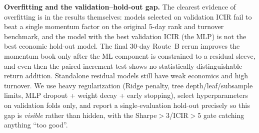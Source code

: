 \documentclass[9pt]{extarticle}
\begin{document}
\textbf{Overfitting and the validation--hold-out gap.} The clearest evidence of
overfitting is in the results themselves: models selected on validation ICIR
fail to beat a single momentum factor on the original 5-day rank and turnover
benchmark, and the model with the best validation ICIR (the MLP) is not the best
economic hold-out model. The final 30-day Route~B rerun improves the momentum
book only after the ML component is constrained to a residual sleeve, and even
then the paired increment test shows no statistically distinguishable return
addition. Standalone residual models still have weak economics and high
turnover. We use heavy regularization
(Ridge penalty, tree depth/leaf/subsample limits, MLP dropout + weight decay +
early stopping), select hyperparameters on validation folds only, and report a
single-evaluation hold-out precisely so this gap is \emph{visible} rather than
hidden, with the Sharpe$>3$/ICIR$>5$ gate catching anything ``too good''.
\end{document}
